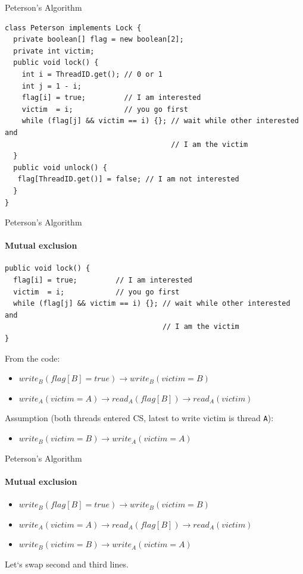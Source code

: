 \begin{frame}[fragile]{Peterson’s Algorithm}

\begin{verbatim}
class Peterson implements Lock {
  private boolean[] flag = new boolean[2];
  private int victim;
  public void lock() {
    int i = ThreadID.get(); // 0 or 1
    int j = 1 - i;
    flag[i] = true;         // I am interested
    victim  = i;            // you go first
    while (flag[j] && victim == i) {}; // wait while other interested and 
                                       // I am the victim
  }
  public void unlock() {
   flag[ThreadID.get()] = false; // I am not interested
  }
}
\end{verbatim}
\end{frame}

\begin{frame}[fragile]{Peterson’s Algorithm}
\framesubtitle{Mutual exclusion}

\begin{verbatim}
public void lock() {
  flag[i] = true;         // I am interested
  victim  = i;            // you go first
  while (flag[j] && victim == i) {}; // wait while other interested and 
                                     // I am the victim
}
\end{verbatim}

From the code:
\begin{itemize}
  \item $write_{B}(flag[B] = true) \rightarrow write_{B}(victim = B)$
  \item $write_{A}(victim = A) \rightarrow read_{A}(flag[B]) \rightarrow read_{A}(victim)$ 
\end{itemize}

Assumption (both threads entered CS, latest to write victim is thread \texttt{A}):
\begin{itemize}
  \item $write_{B}(victim = B) \rightarrow write_{A}(victim = A)$
\end{itemize}

\end{frame}


\begin{frame}[fragile, t]{Peterson’s Algorithm}
\framesubtitle{Mutual exclusion}
\begin{itemize}
  \item $write_{B}(flag[B] = true) \rightarrow write_{B}(victim = B)$
  \item $write_{A}(victim = A) \rightarrow read_{A}(flag[B]) \rightarrow read_{A}(victim)$ 
  \item $write_{B}(victim = B) \rightarrow write_{A}(victim = A)$
\end{itemize}

\pause

Let`s swap second and third lines.

\end{frame}

